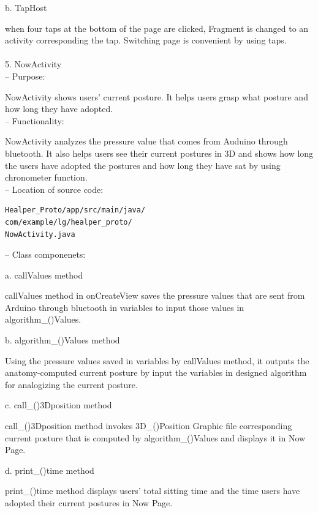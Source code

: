 \documentclass[conference]{IEEEtran}
\begin{document}
b. TapHost

when four taps at the bottom of the page are clicked, Fragment is changed to an activity corresponding the tap. Switching page is convenient by using taps. \\\\

5.	NowActivity\\

 --	Purpose:

NowActivity shows users’ current posture. It helps users grasp what posture and how long they have adopted.  \\

 --	Functionality:

NowActivity analyzes the pressure value that comes from Auduino through bluetooth. It also helps users see their current postures in 3D and shows how long the users have adopted the postures and how long they have sat by using chronometer function.\\

 --	Location of source code:
 
\begin{verbatim}
Healper_Proto/app/src/main/java/
com/example/lg/healper_proto/
NowActivity.java
\end{verbatim}

 --	Class componenets:

a. callValues method 

callValues method in onCreateView saves the pressure values that are sent from Arduino through bluetooth in variables to input those values in algorithm\_()Values. 

b. algorithm\_()Values method 

Using the pressure values saved in variables by callValues method, it outputs the anatomy-computed current posture by input the variables in designed algorithm for analogizing the current posture. 

c. call\_()3Dposition method 

call\_()3Dposition method invokes 3D\_()Position Graphic file corresponding current posture that is computed by algorithm\_()Values and displays it in Now Page. 

d. print\_()time method 

print\_()time method displays users' total sitting time and the time users have adopted their current postures in Now Page. \\\\
\end{document}
